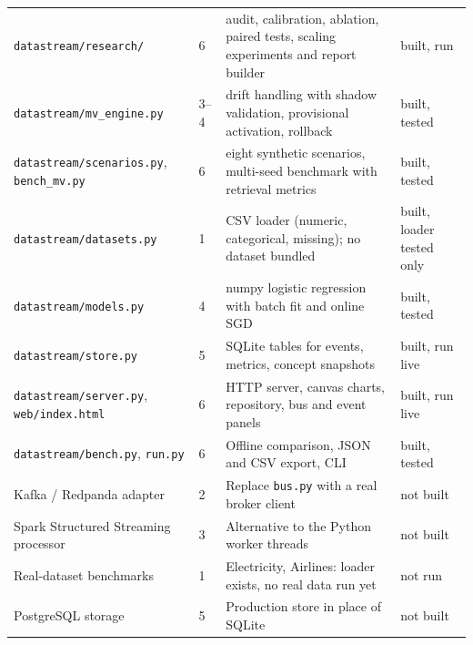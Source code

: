 \documentclass[10pt]{article}
\begin{document}
\begin{tabular}{@{}p{6.2cm}p{2.2cm}p{20cm}p{3.6cm}@{}}
\texttt{datastream/research/} & 6 & audit, calibration, ablation, paired tests, scaling experiments and report builder & \textcolor{okline}{built, run}\\
\texttt{datastream/mv\_engine.py} & 3--4 & drift handling with shadow validation, provisional activation, rollback & \textcolor{okline}{built, tested}\\
\texttt{datastream/scenarios.py}, \texttt{bench\_mv.py} & 6 & eight synthetic scenarios, multi-seed benchmark with retrieval metrics & \textcolor{okline}{built, tested}\\
\texttt{datastream/datasets.py} & 1 & CSV loader (numeric, categorical, missing); no dataset bundled & \textcolor{okline}{built, loader tested only}\\
\texttt{datastream/models.py} & 4 & numpy logistic regression with batch fit and online SGD & \textcolor{okline}{built, tested}\\
\texttt{datastream/store.py} & 5 & SQLite tables for events, metrics, concept snapshots & \textcolor{okline}{built, run live}\\
\texttt{datastream/server.py}, \texttt{web/index.html} & 6 & HTTP server, canvas charts, repository, bus and event panels & \textcolor{okline}{built, run live}\\
\texttt{datastream/bench.py}, \texttt{run.py} & 6 & Offline comparison, JSON and CSV export, CLI & \textcolor{okline}{built, tested}\\
\midrule
Kafka / Redpanda adapter & 2 & Replace \texttt{bus.py} with a real broker client & \textcolor{todoline}{not built}\\
Spark Structured Streaming processor & 3 & Alternative to the Python worker threads & \textcolor{todoline}{not built}\\
Real-dataset benchmarks & 1 & Electricity, Airlines: loader exists, no real data run yet & \textcolor{todoline}{not run}\\
PostgreSQL storage & 5 & Production store in place of SQLite & \textcolor{todoline}{not built}\\
\bottomrule
\end{tabular}
\end{document}
